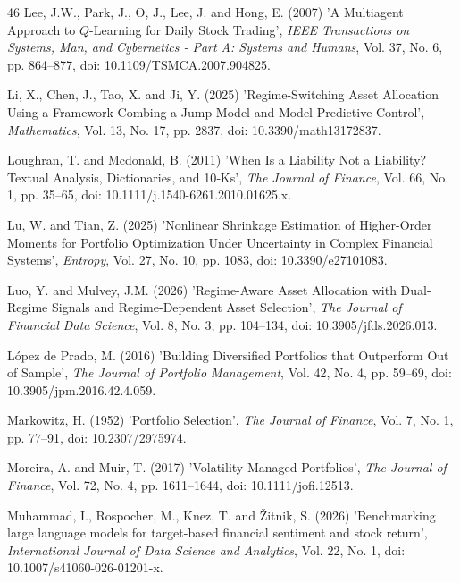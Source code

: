 \begin{thebibliography}{46}
Lee, J.W., Park, J., O, J., Lee, J. and Hong, E. (2007) 'A Multiagent Approach to $Q$-Learning for Daily Stock Trading', {\it IEEE Transactions on Systems, Man, and Cybernetics - Part A: Systems and Humans}, Vol. 37, No. 6, pp. 864--877, doi: 10.1109/TSMCA.2007.904825.

Li, X., Chen, J., Tao, X. and Ji, Y. (2025) 'Regime-Switching Asset Allocation Using a Framework Combing a Jump Model and Model Predictive Control', {\it Mathematics}, Vol. 13, No. 17, pp. 2837, doi: 10.3390/math13172837.

Loughran, T. and Mcdonald, B. (2011) 'When Is a Liability Not a Liability? Textual Analysis, Dictionaries, and 10‐Ks', {\it The Journal of Finance}, Vol. 66, No. 1, pp. 35--65, doi: 10.1111/j.1540-6261.2010.01625.x.

Lu, W. and Tian, Z. (2025) 'Nonlinear Shrinkage Estimation of Higher-Order Moments for Portfolio Optimization Under Uncertainty in Complex Financial Systems', {\it Entropy}, Vol. 27, No. 10, pp. 1083, doi: 10.3390/e27101083.

Luo, Y. and Mulvey, J.M. (2026) 'Regime-Aware Asset Allocation with Dual-Regime Signals and Regime-Dependent Asset Selection', {\it The Journal of Financial Data Science}, Vol. 8, No. 3, pp. 104--134, doi: 10.3905/jfds.2026.013.

López de Prado, M. (2016) 'Building Diversified Portfolios that Outperform Out of Sample', {\it The Journal of Portfolio Management}, Vol. 42, No. 4, pp. 59--69, doi: 10.3905/jpm.2016.42.4.059.

Markowitz, H. (1952) 'Portfolio Selection', {\it The Journal of Finance}, Vol. 7, No. 1, pp. 77--91, doi: 10.2307/2975974.

Moreira, A. and Muir, T. (2017) 'Volatility‐Managed Portfolios', {\it The Journal of Finance}, Vol. 72, No. 4, pp. 1611--1644, doi: 10.1111/jofi.12513.

Muhammad, I., Rospocher, M., Knez, T. and Žitnik, S. (2026) 'Benchmarking large language models for target-based financial sentiment and stock return', {\it International Journal of Data Science and Analytics}, Vol. 22, No. 1, doi: 10.1007/s41060-026-01201-x.


\end{thebibliography}
